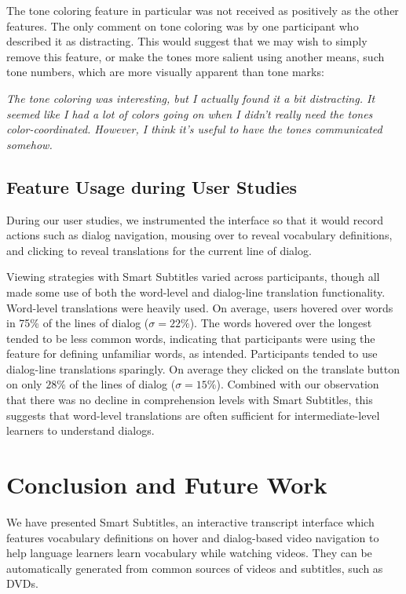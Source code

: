 \documentclass{sigchi}
\begin{document}
The tone coloring feature in particular was not received as positively as the other features. The only comment on tone coloring was by one participant who described it as distracting. This would suggest that we may wish to simply remove this feature, or make the tones more salient using another means, such tone numbers, which are more visually apparent than tone marks:
	 	 	
\emph{The tone coloring was interesting, but I actually found it a bit distracting. It seemed like I had a lot of colors going on when I didn't really need the tones color-coordinated. However, I think it's useful to have the tones communicated somehow.}

\subsection{Feature Usage during User Studies}

During our user studies, we instrumented the interface so that it would record actions such as dialog navigation, mousing over to reveal vocabulary definitions, and clicking to reveal translations for the current line of dialog.

Viewing strategies with Smart Subtitles varied across
participants, though all made some use of both
the word-level and dialog-line translation functionality.
Word-level translations were heavily used. On average,
users hovered over words in 75\% of the lines of dialog
($\sigma = 22\%$).
The words hovered over the longest tended to be less
common words, indicating that participants were using
the feature for defining unfamiliar words, as intended.
Participants tended to use dialog-line translations
sparingly. On average they clicked on the translate
button on only $28\%$ of the lines of dialog
($\sigma = 15\%$).
Combined with our observation that there was no decline in
comprehension levels with Smart Subtitles, this suggests
that word-level translations are often sufficient for
intermediate-level learners to understand dialogs.

\section{Conclusion and Future Work}

We have presented Smart Subtitles, an interactive
transcript interface which features vocabulary
definitions on hover and dialog-based video navigation
to help language learners learn vocabulary while watching videos.
They can be automatically generated from
common sources of videos and subtitles, such as DVDs.
\end{document}
